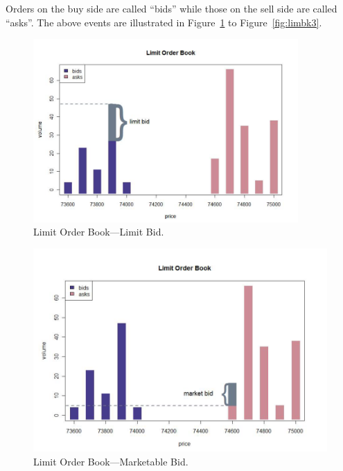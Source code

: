 Orders on the buy side are called ``bids'' while those on the sell side are called ``asks''. The above events are illustrated in Figure~\ref{fig:limbk1} to Figure~\ref{fig:limbk3}.
	\begin{figure}[!ht]
	   \centering
	   \includegraphics[width=0.9\textwidth]{chapters/chapter_trading_fund/figures/limitbk1.png} 
	   \caption{Limit Order Book---Limit Bid. \label{fig:limbk1}}
	\end{figure}
	
	\begin{figure}[!ht]
	   \centering
	   \includegraphics[width=\textwidth]{chapters/chapter_trading_fund/figures/limitbk2.png} 
	   \caption{Limit Order Book---Marketable Bid. \label{fig:limbk2}}
	\end{figure}
	

